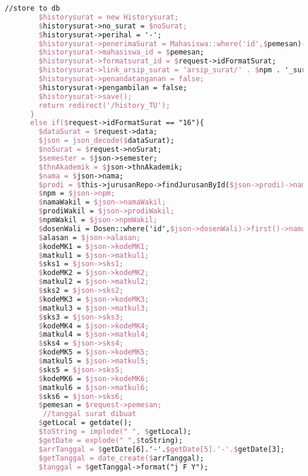 \begin{lstlisting}[language=tex,basicstyle=\tiny,caption=HistorysuratController.php]
        //store to db
        $historysurat = new Historysurat;
        $historysurat->no_surat = $noSurat;
        $historysurat->perihal = '-';
        $historysurat->penerimaSurat = Mahasiswa::where('id',$pemesan)->first()->dosen->nama_dosen;
        $historysurat->mahasiswa_id = $pemesan;
        $historysurat->formatsurat_id = $request->idFormatSurat;
        $historysurat->link_arsip_surat = 'arsip_surat/' . $npm . '_surat_perwakilan_perwalian_5mk.pdf';
        $historysurat->penandatanganan = false;
        $historysurat->pengambilan = false;
        $historysurat->save();
        return redirect('/history_TU');
      }
      else if($request->idFormatSurat == "16"){
        $dataSurat = $request->data;
        $json = json_decode($dataSurat);
        $noSurat = $request->noSurat;
        $semester = $json->semester;
        $thnAkademik = $json->thnAkademik;
        $nama = $json->nama;
        $prodi = $this->jurusanRepo->findJurusanById($json->prodi)->nama_jurusan;
        $npm = $json->npm;
        $namaWakil = $json->namaWakil;
        $prodiWakil = $json->prodiWakil;
        $npmWakil = $json->npmWakil;
        $dosenWali = Dosen::where('id',$json->dosenWali)->first()->nama_dosen;
        $alasan = $json->alasan;
        $kodeMK1 = $json->kodeMK1;
        $matkul1 = $json->matkul1;
        $sks1 = $json->sks1;
        $kodeMK2 = $json->kodeMK2;
        $matkul2 = $json->matkul2;
        $sks2 = $json->sks2;
        $kodeMK3 = $json->kodeMK3;
        $matkul3 = $json->matkul3;
        $sks3 = $json->sks3;
        $kodeMK4 = $json->kodeMK4;
        $matkul4 = $json->matkul4;
        $sks4 = $json->sks4;
        $kodeMK5 = $json->kodeMK5;
        $matkul5 = $json->matkul5;
        $sks5 = $json->sks5;
        $kodeMK6 = $json->kodeMK6;
        $matkul6 = $json->matkul6;
        $sks6 = $json->sks6;
        $pemesan = $request->pemesan;
         //tanggal surat dibuat
        $getLocal = getdate();
        $toString = implode(" ", $getLocal);
        $getDate = explode(" ",$toString);
        $arrTanggal = $getDate[6].'-'.$getDate[5].'-'.$getDate[3];
        $getTanggal = date_create($arrTanggal);
        $tanggal = $getTanggal->format("j F Y");


\end{lstlisting}
